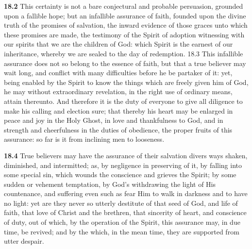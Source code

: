 \par\textbf{18.2} This certainty is not a bare conjectural and probable persuasion, grounded upon a fallible hope; but an infallible assurance of faith, founded upon the divine truth of the promises of salvation, the inward evidence of those graces unto which these promises are made, the testimony of the Spirit of adoption witnessing with our spirits that we are the children of God: which Spirit is the earnest of our inheritance, whereby we are sealed to the day of redemption.  18.3 This infallible assurance does not so belong to the essence of faith, but that a true believer may wait long, and conflict with many difficulties before he be partaker of it: yet, being enabled by the Spirit to know the things which are freely given him of God, he may without extraordinary revelation, in the right use of ordinary means, attain thereunto. And therefore it is the duty of everyone to give all diligence to make his calling and election sure; that thereby his heart may be enlarged in peace and joy in the Holy Ghost, in love and thankfulness to God, and in strength and cheerfulness in the duties of obedience, the proper fruits of this assurance: so far is it from inclining men to looseness.   

\par\textbf{18.4} True believers may have the assurance of their salvation divers ways shaken, diminished, and intermitted; as, by negligence in preserving of it, by falling into some special sin, which wounds the conscience and grieves the Spirit; by some sudden or vehement temptation, by God's withdrawing the light of His countenance, and suffering even such as fear Him to walk in darkness and to have no light: yet are they never so utterly destitute of that seed of God, and life of faith, that love of Christ and the brethren, that sincerity of heart, and conscience of duty, out of which, by the operation of the Spirit, this assurance may, in due time, be revived; and by the which, in the mean time, they are supported from utter despair.  

